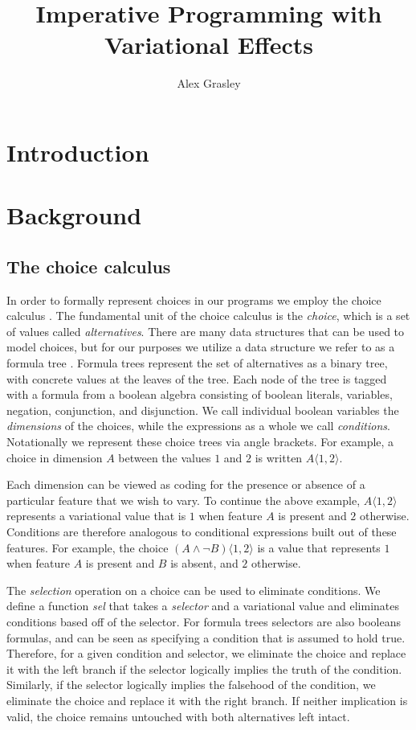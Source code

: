 \documentclass[letterpaper,10pt,onecolumn]{article}
\title{Imperative Programming with Variational Effects}
\author{Alex Grasley}
\newcommand{\tagtree}[3]{#1 \langle #2, #3 \rangle}
\begin{document}
\maketitle

\section{Introduction}


\section{Background}

\subsection{The choice calculus}

In order to formally represent choices in our programs we employ the choice
calculus \cite{ericthesis,erwig2011choice}. The fundamental unit of the choice calculus is
the \emph{choice}, which is a set of values called \emph{alternatives}.
There are many data structures that can be used to model
choices, but for our purposes we utilize a data structure we refer
to as a formula tree \cite{walkingshaw2014projectional,walkingshaw2014variational}.
Formula trees represent the set of alternatives as a binary tree, with concrete
values at the leaves of the tree. Each node of the tree is tagged with a formula from a boolean
algebra consisting of boolean literals, variables, negation, conjunction, and disjunction. We call individual
boolean variables the \emph{dimensions} of the choices, while the expressions as a whole we call \emph{conditions}. Notationally we represent these choice trees
via angle brackets. For example, a choice in dimension $A$
between the values $1$ and $2$ is written $\tagtree{A}{1}{2}$.

Each dimension can be viewed as coding for the presence or absence of a
particular feature that we wish to vary. To continue the above example, $\tagtree{A}{1}{2}$
represents a variational value that is $1$ when feature $A$ is present and $2$ otherwise. Conditions
are therefore analogous to conditional expressions built out of these features. For example, the choice $\tagtree{(A \wedge \neg B)}{1}{2}$
is a value that represents $1$ when feature $A$ is present and $B$ is absent, and $2$ otherwise.

The \emph{selection} operation on a choice can be used to eliminate conditions. We define a function
\emph{sel} that takes a \emph{selector} and a variational value and eliminates conditions based off
of the selector. For formula trees selectors are also booleans formulas, and can be seen as specifying
a condition that is assumed to hold true. Therefore, for a given condition and
selector, we eliminate the choice and replace it with the left branch if the selector logically implies
the truth of the condition. Similarly, if the selector logically implies the falsehood of the condition, we eliminate the choice
and replace it with the right branch. If neither implication is valid, the choice remains untouched with
both alternatives left intact.
\end{document}
